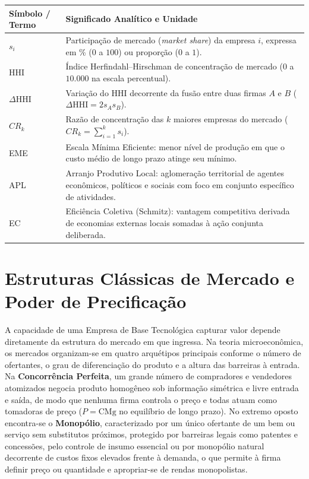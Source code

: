 
\begin{boxSimbolo}
\begin{tabularx}{\linewidth}{@{}l X@{}}
  \toprule
  \textbf{Símbolo / Termo} & \textbf{Significado Analítico e Unidade} \\
  \midrule
  $s_i$ & Participação de mercado (\textit{market share}) da empresa $i$, expressa em \% ($0$ a $100$) ou proporção ($0$ a $1$). \\
  $\text{HHI}$ & Índice Herfindahl--Hirschman de concentração de mercado ($0$ a $10.000$ na escala percentual). \\
  $\Delta \text{HHI}$ & Variação do $\text{HHI}$ decorrente da fusão entre duas firmas $A$ e $B$ ($\Delta \text{HHI} = 2 s_A s_B$). \\
  $CR_k$ & Razão de concentração das $k$ maiores empresas do mercado ($CR_k = \sum_{i=1}^k s_i$). \\
  EME & Escala Mínima Eficiente: menor nível de produção em que o custo médio de longo prazo atinge seu mínimo. \\
  APL & Arranjo Produtivo Local: aglomeração territorial de agentes econômicos, políticos e sociais com foco em conjunto específico de atividades. \\
  EC & Eficiência Coletiva (Schmitz): vantagem competitiva derivada de economias externas locais somadas à ação conjunta deliberada. \\
  \bottomrule
\end{tabularx}
\end{boxSimbolo}

\section{Estruturas Clássicas de Mercado e Poder de Precificação}

A capacidade de uma Empresa de Base Tecnológica capturar valor depende diretamente da estrutura do mercado em que ingressa. Na teoria microeconômica, os mercados organizam-se em quatro arquétipos principais conforme o número de ofertantes, o grau de diferenciação do produto e a altura das barreiras à entrada. Na \textbf{Concorrência Perfeita}, um grande número de compradores e vendedores atomizados negocia produto homogêneo sob informação simétrica e livre entrada e saída, de modo que nenhuma firma controla o preço e todas atuam como tomadoras de preço ($P = \text{CMg}$ no equilíbrio de longo prazo). No extremo oposto encontra-se o \textbf{Monopólio}, caracterizado por um único ofertante de um bem ou serviço sem substitutos próximos, protegido por barreiras legais como patentes e concessões, pelo controle de insumo essencial ou por monopólio natural decorrente de custos fixos elevados frente à demanda, o que permite à firma definir preço ou quantidade e apropriar-se de rendas monopolistas.

